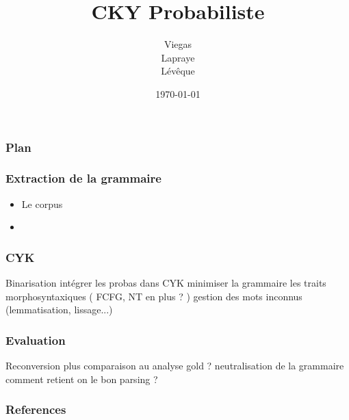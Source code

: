 \documentclass{beamer}
\begin{document}
\title{CKY Probabiliste}  %
\author{Viegas\\Lapraye\\Lévêque}

\date{\today}


\begin{frame}
 \maketitle
\end{frame}



\begin{frame} %
\frametitle{Plan}
\end{frame}

\begin{frame}
\frametitle{Extraction de la grammaire}

\begin{itemize}
 \item<1-3> Le corpus
 \item<2-3> 
\end{itemize}

 
\end{frame}




\begin{frame}
 \frametitle{CYK}
 Binarisation 
 intégrer les probas dans CYK
 minimiser la grammaire
 les traits morphosyntaxiques ( FCFG, NT en plus ? )
 gestion des mots inconnus (lemmatisation, lissage...)
 
\end{frame}

\begin{frame}
\frametitle{Evaluation}
 Reconversion plus comparaison au analyse gold
? neutralisation de la grammaire
comment retient on le bon parsing ?
\end{frame}

\begin{frame}[allowframebreaks]
        \frametitle{References}
        
        
\end{frame}



%
%
%
%
%
%
\end{document}
